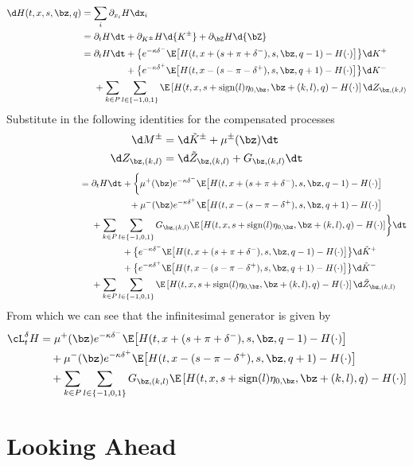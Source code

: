 \documentclass[12pt]{article}
\begin{document}
\begin{align*}
\d H (t,x,s,\bz,q) & = \sum\limits_i \partial_{x_i} H \dx_i \\
& = \partial_t H \dt + \partial_{K^{\pm}} H \d {K^{\pm}} + \partial_{\bZ} H \d {\bZ} \\
& = \partial_t H \dt + \bigl\lbrace e^{ -\kappa \delta^{-}} \E \bigl[ H(t,x+(s+\pi+\delta^-),s,\bz,q-1) - H(\cdot) \bigr] \bigr\rbrace \d K^+\\
& \hphantom{{}={} \partial_t H \dt} + \bigl\lbrace e^{ -\kappa \delta^{+}} \E \bigl[ H(t,x-(s-\pi-\delta^+),s,\bz,q+1) - H(\cdot) \bigr] \bigr\rbrace \d K^-\\
& \hphantom{{}={}} + \sum_{k\in P} \sum_{l \in \{-1,0,1\}} \E \left[ H(t,x,s+\mathrm{sign}(l)\eta_{0,\bz},\bz+(k,l),q) - H(\cdot) \right] \d Z_{\bz,(k,l)}
\end{align*}
Substitute in the following identities for the compensated processes
\begin{align*} 
\d M^{\pm} & = \d \tilde{K}^{\pm} + \mu^{\pm}(\bz) \dt \\
\d Z_{\bz,(k,l)}  & = \d \tilde{Z}_{\bz,(k,l)}  + G_{\bz,(k,l)} \dt 
\end{align*}
\begin{align*}
{}\phantom{\d H (t,x,s,\bz,q)} & = \partial_t H \dt + \biggl\lbrace \mu^+(\bz) e^{ -\kappa \delta^{-}} \E \bigl[ H(t,x+(s+\pi+\delta^-),s,\bz,q-1) - H(\cdot) \bigr] \\
& \hphantom{{}={} \partial_t H \dt +} + \mu^-(\bz) e^{ -\kappa \delta^{+}} \E \bigl[ H(t,x-(s-\pi-\delta^+),s,\bz,q+1) - H(\cdot) \bigr] \\
& \hphantom{{}={}} + \sum_{k\in P} \sum_{l \in \{-1,0,1\}} G_{\bz,(k,l)} \E \left[ H(t,x,s+\mathrm{sign}(l)\eta_{0,\bz},\bz+(k,l),q) - H(\cdot) \right]  \biggr\rbrace \dt \\
& \hphantom{{}={} \partial_t H \dt} + \bigl\lbrace e^{ -\kappa \delta^{-}} \E \bigl[ H(t,x+(s+\pi+\delta^-),s,\bz,q-1) - H(\cdot) \bigr] \bigr\rbrace \d \tilde{K}^+\\
& \hphantom{{}={} \partial_t H \dt} + \bigl\lbrace e^{ -\kappa \delta^{+}} \E \bigl[ H(t,x-(s-\pi-\delta^+),s,\bz,q+1) - H(\cdot) \bigr] \bigr\rbrace \d \tilde{K}^-\\
& \hphantom{{}={}} + \sum_{k\in P} \sum_{l \in \{-1,0,1\}} \E \left[ H(t,x,s+\mathrm{sign}(l)\eta_{0,\bz},\bz+(k,l),q) - H(\cdot) \right] \d \tilde{Z}_{\bz,(k,l)}\
\end{align*}
From which we can see that the infinitesimal generator is given by
\begin{equation}
\begin{split}
\cL^{\delta}_t H & = \mu^+(\bz) e^{ -\kappa \delta^{-}} \E \bigl[ H(t,x+(s+\pi+\delta^-),s,\bz,q-1) - H(\cdot) \bigr] \\
& \quad + \mu^-(\bz) e^{ -\kappa \delta^{+}} \E \bigl[ H(t,x-(s-\pi-\delta^+),s,\bz,q+1) - H(\cdot) \bigr] \\
& \quad + \sum_{k\in P} \sum_{l \in \{-1,0,1\}} G_{\bz,(k,l)} \E \left[ H(t,x,s+\mathrm{sign}(l)\eta_{0,\bz},\bz+(k,l),q) - H(\cdot) \right] 
\end{split}
\end{equation}


\section*{Looking Ahead}
\end{document}
